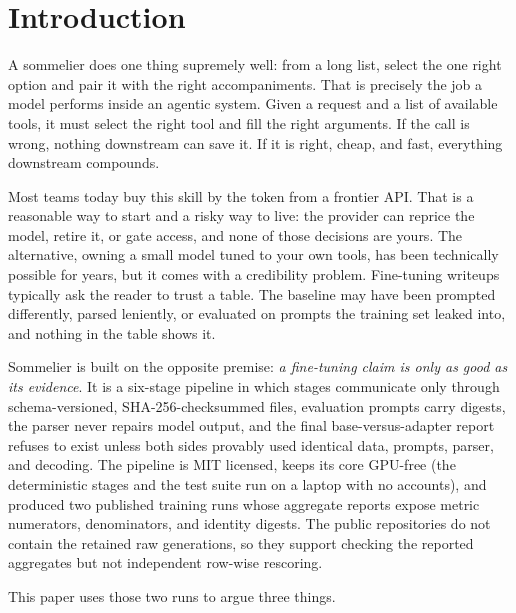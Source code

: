 \documentclass{article}
\newcommand{\sommelier}{Sommelier}
\begin{document}
\section{Introduction}
\label{sec:intro}

A sommelier does one thing supremely well: from a long list, select the one right option and pair it with the right accompaniments. That is precisely the job a model performs inside an agentic system. Given a request and a list of available tools, it must select the right tool and fill the right arguments. If the call is wrong, nothing downstream can save it. If it is right, cheap, and fast, everything downstream compounds.

Most teams today buy this skill by the token from a frontier API. That is a reasonable way to start and a risky way to live: the provider can reprice the model, retire it, or gate access, and none of those decisions are yours. The alternative, owning a small model tuned to your own tools, has been technically possible for years, but it comes with a credibility problem. Fine-tuning writeups typically ask the reader to trust a table. The baseline may have been prompted differently, parsed leniently, or evaluated on prompts the training set leaked into, and nothing in the table shows it.

\sommelier{} is built on the opposite premise: \emph{a fine-tuning claim is only as good as its evidence}. It is a six-stage pipeline in which stages communicate only through schema-versioned, SHA-256-checksummed files, evaluation prompts carry digests, the parser never repairs model output, and the final base-versus-adapter report refuses to exist unless both sides provably used identical data, prompts, parser, and decoding. The pipeline is MIT licensed, keeps its core GPU-free (the deterministic stages and the test suite run on a laptop with no accounts), and produced two published training runs whose aggregate reports expose metric numerators, denominators, and identity digests. The public repositories do not contain the retained raw generations, so they support checking the reported aggregates but not independent row-wise rescoring.

This paper uses those two runs to argue three things.
\end{document}
